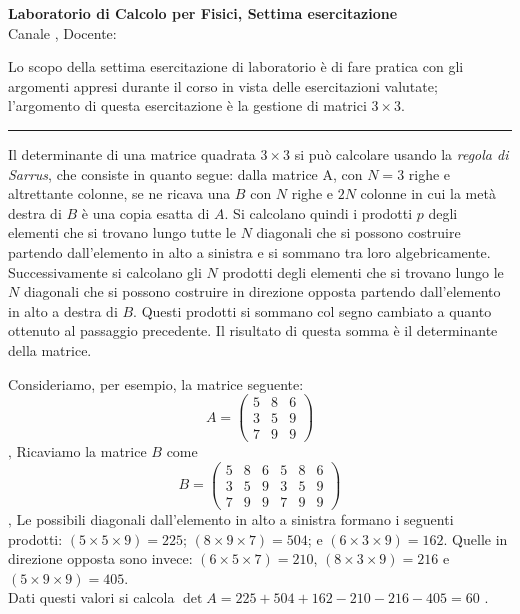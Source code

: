 \documentclass[11pt]{article}
\begin{document}
\pagestyle{empty}

\begin{center}
{\Large \bf  Laboratorio di Calcolo per Fisici, Settima esercitazione\\[2mm]}
{\large Canale \canale, Docente: \docente}
\end{center}
\vspace{4mm}

\begin{mdframed}[backgroundcolor=gray!10]
  Lo scopo della settima esercitazione di laboratorio è di fare pratica con
gli argomenti appresi durante il corso in vista delle esercitazioni valutate;
l'argomento di questa esercitazione è la gestione di matrici $3 \times 3$.
  \end{mdframed}
%
%



\hrule
\vspace{2mm}
Il determinante di una matrice quadrata $3 \times 3$ si può calcolare usando la {\em regola di Sarrus}, che consiste in quanto segue: dalla matrice A, con $N = 3$ righe 
e altrettante colonne, se ne ricava una $B$ con $N$ righe e $2N$ colonne in
cui la metà destra di $B$ è una copia esatta di $A$. Si calcolano quindi i prodotti $p$ degli elementi che si trovano
lungo tutte le $N$ diagonali che si possono costruire partendo dall’elemento in alto a sinistra e si sommano tra loro
algebricamente. Successivamente si calcolano gli $N$ prodotti degli elementi che si trovano lungo le $N$ diagonali che
si possono costruire in direzione opposta partendo dall’elemento in alto a destra di $B$. Questi prodotti si sommano
col segno cambiato a quanto ottenuto al passaggio precedente. Il risultato di questa somma è il determinante della
matrice.

Consideriamo, per esempio, la matrice seguente:
\[
A = \left(\begin{array}{ccc}
5 &8& 6\\
3 &5 &9\\
7 & 9 & 9
\end{array}
\right)
\]
‚
Ricaviamo la matrice $B$ come
\[
B = \left(\begin{array}{cccccc}
5 & 8 & 6 &5 & 8 & 6\\
3 & 5 & 9 &3 &5  &9\\
7 & 9 & 9 &7 &9 & 9
\end{array}
\right)
\]
‚
Le possibili diagonali dall'elemento in alto a sinistra formano i seguenti prodotti: $(5 \times 5 \times 9)= 225$;
$(8 \times 9 \times 7)= 504$; 
e $(6\times3\times9)=162$. Quelle in direzione opposta sono invece: 
$(6\times5\times7)=210$, $(8\times3\times9)=216$ e $(5\times9\times9)=405$.
\\
Dati questi valori si calcola
$\det A = 225 + 504 +162 - 210 - 216 -405= 60$ .
\end{document}

